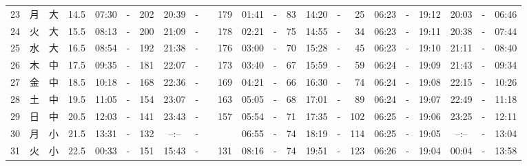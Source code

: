 \documentclass[12pt,a4j]{jsarticle}
\begin{document}
\begin{table}[htbp]
\begin{center}
{\begin{tabular}{|rc|cr|ccrccr|ccrccr|ccc|ccc|}
23 & 月 & 大 & 14.5 &  07:30 &-& 202 &  20:39 &-& 179 &  01:41 &-&  83 &  14:20 &-&  25 & 06:23 & -& 19:12 & 20:03 & -& 06:46 \\
24 & 火 & 大 & 15.5 &  08:13 &-& 200 &  21:09 &-& 178 &  02:21 &-&  75 &  14:55 &-&  34 & 06:23 & -& 19:11 & 20:38 & -& 07:44 \\
25 & 水 & 大 & 16.5 &  08:54 &-& 192 &  21:38 &-& 176 &  03:00 &-&  70 &  15:28 &-&  45 & 06:23 & -& 19:10 & 21:11 & -& 08:40 \\
26 & 木 & 中 & 17.5 &  09:35 &-& 181 &  22:07 &-& 173 &  03:40 &-&  67 &  15:59 &-&  59 & 06:24 & -& 19:09 & 21:43 & -& 09:34 \\
27 & 金 & 中 & 18.5 &  10:18 &-& 168 &  22:36 &-& 169 &  04:21 &-&  66 &  16:30 &-&  74 & 06:24 & -& 19:08 & 22:15 & -& 10:26 \\
28 & 土 & 中 & 19.5 &  11:05 &-& 154 &  23:07 &-& 163 &  05:05 &-&  68 &  17:01 &-&  89 & 06:24 & -& 19:07 & 22:49 & -& 11:18 \\
29 & 日 & 中 & 20.5 &  12:03 &-& 141 &  23:43 &-& 157 &  05:54 &-&  71 &  17:35 &-& 102 & 06:25 & -& 19:06 & 23:25 & -& 12:11 \\
30 & 月 & 小 & 21.5 &  13:31 &-& 132 &  --:-- &-&~~~~~ &  06:55 &-&  74 &  18:19 &-& 114 & 06:25 & -& 19:05 & --:-- & -& 13:04 \\
31 & 火 & 小 & 22.5 &  00:33 &-& 151 &  15:43 &-& 131 &  08:16 &-&  74 &  19:51 &-& 123 & 06:26 & -& 19:04 & 00:04 & -& 13:58 \\
   \hline
   \end{tabular}}
   \end{center}
\end{table}
\newpage
\end{document}
